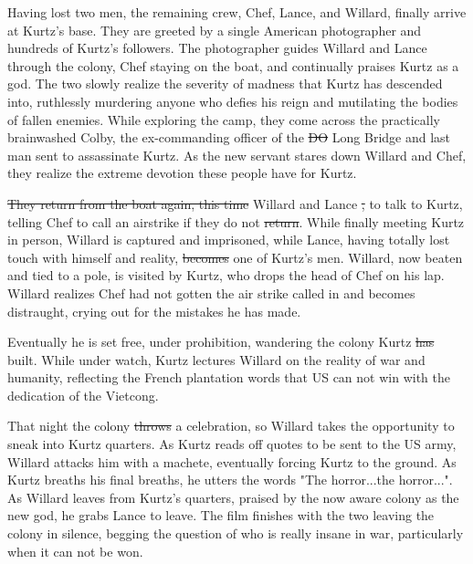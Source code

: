 \documentclass[a4paper,man,natbib]{apa6}
\providecommand{\DIFadd}[1]{{\protect\color{blue}\uwave{#1}}} %
\providecommand{\DIFdel}[1]{{\protect\color{red}\sout{#1}}}                      %
\providecommand{\DIFaddbegin}{} %
\providecommand{\DIFaddend}{} %
\providecommand{\DIFdelbegin}{} %
\providecommand{\DIFdelend}{} %
\begin{document}
Having lost two men, the remaining crew, Chef, Lance, and Willard, finally arrive at Kurtz's base. They are greeted by a single American photographer and hundreds of Kurtz's followers. The photographer guides Willard and Lance through the colony, Chef staying on the boat, and continually praises Kurtz as a god. The two slowly realize the severity of madness that Kurtz has descended into, ruthlessly murdering anyone who defies his reign and mutilating the bodies of fallen enemies. While exploring the camp, they come across the practically brainwashed Colby, the ex-commanding officer of the \DIFdelbegin \DIFdel{DO }\DIFdelend \DIFaddbegin \DIFadd{Do }\DIFaddend Long Bridge and last man sent to assassinate Kurtz. As the new servant stares down Willard and Chef, they realize the extreme devotion these people have for Kurtz.

\DIFdelbegin \DIFdel{They return from the boat again, this time }\DIFdelend Willard and Lance \DIFdelbegin \DIFdel{, }\DIFdelend \DIFaddbegin \DIFadd{returned to the village }\DIFaddend to talk to Kurtz, telling Chef to call an airstrike if they do not \DIFdelbegin \DIFdel{return}\DIFdelend \DIFaddbegin \DIFadd{come back}\DIFaddend . While finally meeting Kurtz in person, Willard is captured and imprisoned, while Lance, having totally lost touch with himself and reality, \DIFdelbegin \DIFdel{becomes }\DIFdelend \DIFaddbegin \DIFadd{became }\DIFaddend one of Kurtz's men. Willard, now beaten and tied to a pole, is visited by Kurtz, who drops the head of Chef on his lap. Willard realizes Chef had not gotten the air strike called in and becomes distraught, crying out for the mistakes he has made.

Eventually he is set free, under prohibition, wandering the colony Kurtz \DIFdelbegin \DIFdel{has }\DIFdelend built. While under watch, Kurtz lectures Willard on the reality of war and humanity, reflecting the French plantation words that US can not win with the dedication of the Vietcong.

That night the colony \DIFdelbegin \DIFdel{throws }\DIFdelend \DIFaddbegin \DIFadd{threw }\DIFaddend a celebration, so Willard takes the opportunity to sneak into Kurtz quarters. As Kurtz reads off quotes to be sent to the US army, Willard attacks him with a machete, eventually forcing Kurtz to the ground. As Kurtz breaths his final breaths, he utters the words "The horror...the horror...". As Willard leaves from Kurtz's quarters, praised by the now aware colony as the new god, he grabs Lance to leave. The film finishes with the two leaving the colony  in silence, begging the question of who is really insane in war, particularly when it can not be won.
\end{document}
